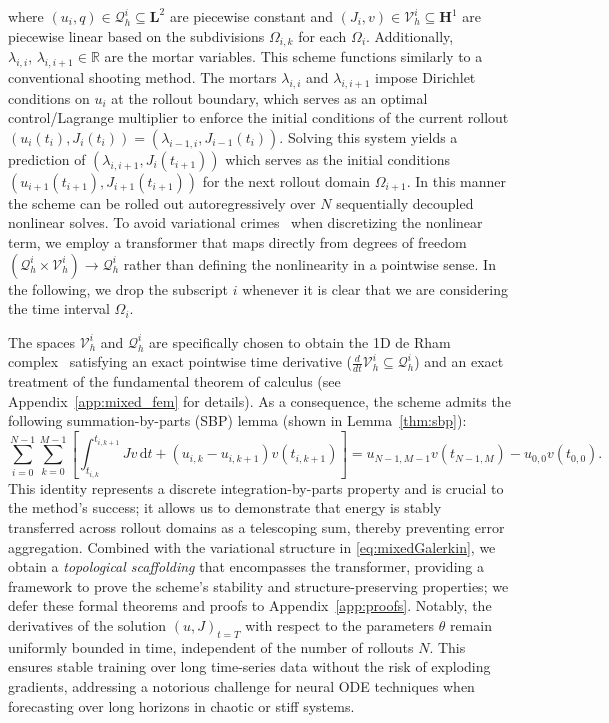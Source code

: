 \documentclass[12pt]{article}
\begin{document}
where $(u_i,q) \in \mathcal{Q}_h^i \subseteq \mathbf{L}^2$ are piecewise constant and $(J_i,v) \in \mathcal{V}_h^i \subseteq \mathbf{H}^1$ are piecewise linear based on the subdivisions $\Omega_{i,k}$ for each $\Omega_i$.  Additionally, $\lambda_{i,i}, \, \lambda_{i,i+1} \in \mathbb{R}$  are the mortar variables. This scheme functions similarly to a conventional shooting method. The mortars $\lambda_{i,i}$ and $\lambda_{i,i+1}$ impose Dirichlet conditions on $u_i$ at the rollout boundary, which serves as an optimal control/Lagrange multiplier to enforce the initial conditions of the current rollout $(u_i(t_i), J_i(t_i)) = (\lambda_{i-1, i}, J_{i-1}(t_i))$. Solving this system yields a prediction of $(\lambda_{i,i+1}, J_i(t_{i+1}))$ which serves as the initial conditions $(u_{i+1}(t_{i+1}),J_{i+1}(t_{i+1}))$ for the next rollout domain $\Omega_{i+1}$. In this manner the scheme can be rolled out autoregressively over $N$ sequentially decoupled nonlinear solves. To avoid variational crimes~\cite{strang1973analysis} when discretizing the nonlinear term, we employ a transformer that maps directly from degrees of freedom $(\mathcal{Q}_h^i \times \mathcal{V}_h^i) \rightarrow \mathcal{Q}_h^i$ rather than defining the nonlinearity in a pointwise sense.  In the following, we drop the subscript $i$ whenever it is clear that we are considering the time interval $\Omega_i$.

The spaces $\mathcal{V}_h^i$ and $\mathcal{Q}_h^i$ are specifically chosen to obtain the 1D de Rham complex~\cite{arnold2018finite} satisfying an exact pointwise time derivative ($\frac{d}{dt} \mathcal{V}_h^i \subseteq \mathcal{Q}_h^i$) and an exact treatment of the fundamental theorem of calculus (see Appendix~\ref{app:mixed_fem} for details). As a consequence, the scheme admits the following summation-by-parts (SBP) lemma (shown in Lemma~\ref{thm:sbp}):
\begin{equation} \label{eqn:sbp}
	\sum_{i=0}^{N-1}\sum_{k=0}^{M-1}
	\left[
	\int_{t_{i,k}}^{t_{i,k+1}} J v \, \mathrm{d}t
	+ (u_{i,k} - u_{i,k+1})  v(t_{i,k+1})
	\right]
	= u_{N-1,M-1} v(t_{N-1,M}) - u_{0,0} v(t_{0,0}).
\end{equation}
This identity represents a discrete integration-by-parts property and is crucial to the method's success; it allows us to demonstrate that energy is stably transferred across rollout domains as a telescoping sum, thereby preventing error aggregation. Combined with the variational structure in \eqref{eq:mixedGalerkin}, we obtain a \textit{topological scaffolding} that encompasses the transformer, providing a framework to prove the scheme's stability and structure-preserving properties; we defer these formal theorems and proofs to Appendix~\ref{app:proofs}. Notably, the derivatives of the solution $(u,J)_{t = T}$ with respect to the parameters $\theta$ remain uniformly bounded in time, independent of the number of rollouts $N$. This ensures stable training over long time-series data without the risk of exploding gradients, addressing a notorious challenge for neural ODE techniques when forecasting over long horizons in chaotic or stiff systems.
\end{document}
